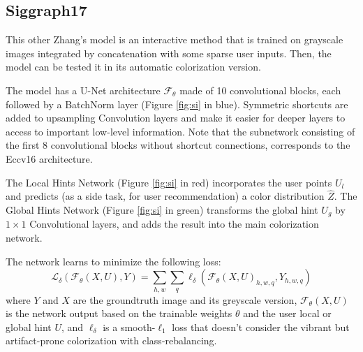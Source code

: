 \subsection{Siggraph17}

This other Zhang's model is an interactive method that is trained on grayscale images integrated by concatenation with some sparse user inputs. Then, the model can be tested it in its automatic colorization version.

The model has a U-Net architecture $\mathcal{F}_\theta$ made of 10 convolutional blocks, each followed by a BatchNorm layer (Figure \ref{fig:si} in blue).
Symmetric shortcuts are added to upsampling Convolution layers and make it easier for deeper layers to access to important low-level information. Note that the subnetwork consisting of the first 8
convolutional blocks without shortcut connections, corresponds to the Eccv16 architecture.

The Local Hints Network (Figure \ref{fig:si} in red) incorporates the user points $U_l$ and predicts (as a side task, for user recommendation) a color distribution $\hat{Z}$. The Global Hints Network (Figure \ref{fig:si} in green) transforms the global hint $U_g$ by $1\times1$ Convolutional layers, and adds the result into the main colorization network.

The network learns to minimize the following loss:
\begin{equation*}
	\mathcal{L}_\delta(\mathcal{F}_\theta(X, U), Y) = \sum_{h,w} \sum_{q} \ell_\delta (\mathcal{F}_\theta(X, U)_{h,w,q}, Y_{h,w,q})
\end{equation*}
where $Y$ and $X$ are the groundtruth image and its greyscale version, $\mathcal{F}_\theta(X, U)$ is the network output based on the trainable weights $\theta$ and the user local or global hint $U$, and $\ell_\delta$ is a smooth-$\ell_1$ loss that doesn't consider the vibrant but artifact-prone colorization with class-rebalancing.

